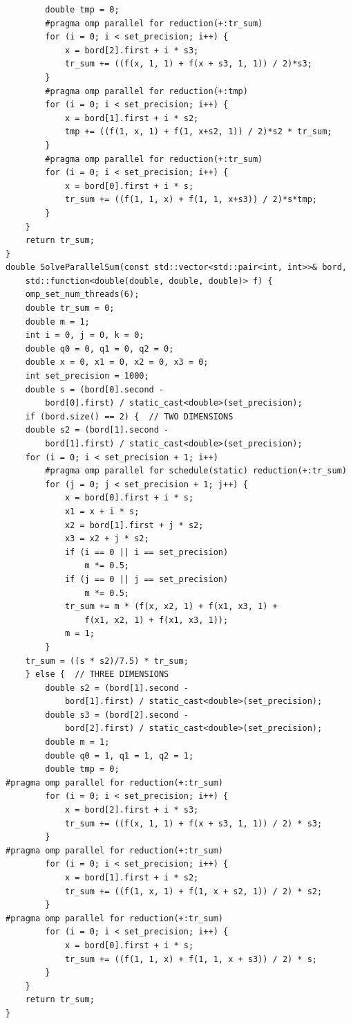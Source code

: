 \documentclass{report}
\begin{document}
\begin{verbatim}
        double tmp = 0;
        #pragma omp parallel for reduction(+:tr_sum)
        for (i = 0; i < set_precision; i++) {
            x = bord[2].first + i * s3;
            tr_sum += ((f(x, 1, 1) + f(x + s3, 1, 1)) / 2)*s3;
        }
        #pragma omp parallel for reduction(+:tmp)
        for (i = 0; i < set_precision; i++) {
            x = bord[1].first + i * s2;
            tmp += ((f(1, x, 1) + f(1, x+s2, 1)) / 2)*s2 * tr_sum;
        }
        #pragma omp parallel for reduction(+:tr_sum)
        for (i = 0; i < set_precision; i++) {
            x = bord[0].first + i * s;
            tr_sum += ((f(1, 1, x) + f(1, 1, x+s3)) / 2)*s*tmp;
        }
    }
    return tr_sum;
}
double SolveParallelSum(const std::vector<std::pair<int, int>>& bord,
    std::function<double(double, double, double)> f) {
    omp_set_num_threads(6);
    double tr_sum = 0;
    double m = 1;
    int i = 0, j = 0, k = 0;
    double q0 = 0, q1 = 0, q2 = 0;
    double x = 0, x1 = 0, x2 = 0, x3 = 0;
    int set_precision = 1000;
    double s = (bord[0].second -
        bord[0].first) / static_cast<double>(set_precision);
    if (bord.size() == 2) {  // TWO DIMENSIONS
    double s2 = (bord[1].second -
        bord[1].first) / static_cast<double>(set_precision);
    for (i = 0; i < set_precision + 1; i++)
        #pragma omp parallel for schedule(static) reduction(+:tr_sum)
        for (j = 0; j < set_precision + 1; j++) {
            x = bord[0].first + i * s;
            x1 = x + i * s;
            x2 = bord[1].first + j * s2;
            x3 = x2 + j * s2;
            if (i == 0 || i == set_precision)
                m *= 0.5;
            if (j == 0 || j == set_precision)
                m *= 0.5;
            tr_sum += m * (f(x, x2, 1) + f(x1, x3, 1) +
                f(x1, x2, 1) + f(x1, x3, 1));
            m = 1;
        }
    tr_sum = ((s * s2)/7.5) * tr_sum;
    } else {  // THREE DIMENSIONS
        double s2 = (bord[1].second -
            bord[1].first) / static_cast<double>(set_precision);
        double s3 = (bord[2].second -
            bord[2].first) / static_cast<double>(set_precision);
        double m = 1;
        double q0 = 1, q1 = 1, q2 = 1;
        double tmp = 0;
#pragma omp parallel for reduction(+:tr_sum)
        for (i = 0; i < set_precision; i++) {
            x = bord[2].first + i * s3;
            tr_sum += ((f(x, 1, 1) + f(x + s3, 1, 1)) / 2) * s3;
        }
#pragma omp parallel for reduction(+:tr_sum)
        for (i = 0; i < set_precision; i++) {
            x = bord[1].first + i * s2;
            tr_sum += ((f(1, x, 1) + f(1, x + s2, 1)) / 2) * s2;
        }
#pragma omp parallel for reduction(+:tr_sum)
        for (i = 0; i < set_precision; i++) {
            x = bord[0].first + i * s;
            tr_sum += ((f(1, 1, x) + f(1, 1, x + s3)) / 2) * s;
        }
    }
    return tr_sum;
}
\end{verbatim}
\end{document}
